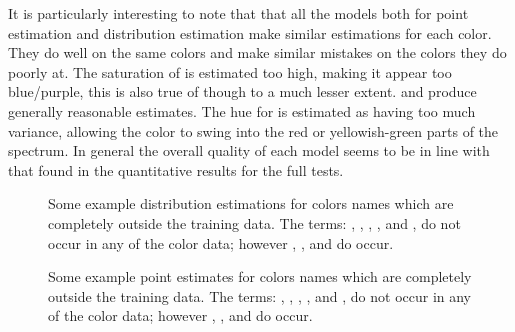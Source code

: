 \documentclass[11pt,a4paper]{article}
\begin{document}
It is particularly interesting to note that that all the models both for point estimation and distribution estimation make similar estimations for each color.
They do well on the same colors and make similar mistakes on the colors they do poorly at.
The saturation of  is estimated too high, making it appear too blue/purple, this is also true of  though to a much lesser extent.
 and  produce generally reasonable estimates.
The hue for  is estimated as having too much variance, allowing the color to swing into the red or yellowish-green parts of the spectrum.
In general the overall quality of each model seems to be in line with that found in the quantitative results for the full tests.







\begin{figure}
	
	\caption{Some example distribution estimations for colors names which are completely outside the training data. The terms: , , , , and , do not occur in any of the color data; however ,  , and  do occur.} \label{fig:oovdist}
\end{figure}

\begin{figure}
\caption{Some example point estimates for colors names which are completely outside the training data. The terms: , , , , and , do not occur in any of the color data; however ,  , and  do occur.} \label{fig:oovpoint}
\end{figure}
\end{document}
